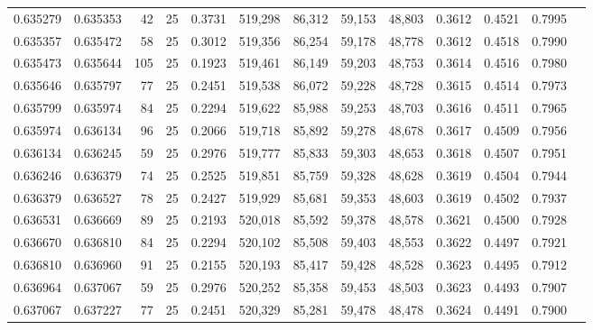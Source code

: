 \begin{tabular}{rrrrrrrrrrrrr}
0.635279 & 0.635353 &    42 &  25 &                                     0.3731 & 519,298 &  86,312 &  59,153 &  48,803 & 0.3612 & 0.4521 & 0.7995 \\
0.635357 & 0.635472 &    58 &  25 &                                     0.3012 & 519,356 &  86,254 &  59,178 &  48,778 & 0.3612 & 0.4518 & 0.7990 \\
0.635473 & 0.635644 &   105 &  25 &                                     0.1923 & 519,461 &  86,149 &  59,203 &  48,753 & 0.3614 & 0.4516 & 0.7980 \\
0.635646 & 0.635797 &    77 &  25 &                                     0.2451 & 519,538 &  86,072 &  59,228 &  48,728 & 0.3615 & 0.4514 & 0.7973 \\
0.635799 & 0.635974 &    84 &  25 &                                     0.2294 & 519,622 &  85,988 &  59,253 &  48,703 & 0.3616 & 0.4511 & 0.7965 \\
0.635974 & 0.636134 &    96 &  25 &                                     0.2066 & 519,718 &  85,892 &  59,278 &  48,678 & 0.3617 & 0.4509 & 0.7956 \\
0.636134 & 0.636245 &    59 &  25 &                                     0.2976 & 519,777 &  85,833 &  59,303 &  48,653 & 0.3618 & 0.4507 & 0.7951 \\
0.636246 & 0.636379 &    74 &  25 &                                     0.2525 & 519,851 &  85,759 &  59,328 &  48,628 & 0.3619 & 0.4504 & 0.7944 \\
0.636379 & 0.636527 &    78 &  25 &                                     0.2427 & 519,929 &  85,681 &  59,353 &  48,603 & 0.3619 & 0.4502 & 0.7937 \\
0.636531 & 0.636669 &    89 &  25 &                                     0.2193 & 520,018 &  85,592 &  59,378 &  48,578 & 0.3621 & 0.4500 & 0.7928 \\
0.636670 & 0.636810 &    84 &  25 &                                     0.2294 & 520,102 &  85,508 &  59,403 &  48,553 & 0.3622 & 0.4497 & 0.7921 \\
0.636810 & 0.636960 &    91 &  25 &                                     0.2155 & 520,193 &  85,417 &  59,428 &  48,528 & 0.3623 & 0.4495 & 0.7912 \\
0.636964 & 0.637067 &    59 &  25 &                                     0.2976 & 520,252 &  85,358 &  59,453 &  48,503 & 0.3623 & 0.4493 & 0.7907 \\
0.637067 & 0.637227 &    77 &  25 &                                     0.2451 & 520,329 &  85,281 &  59,478 &  48,478 & 0.3624 & 0.4491 & 0.7900 \\

\end{tabular}
